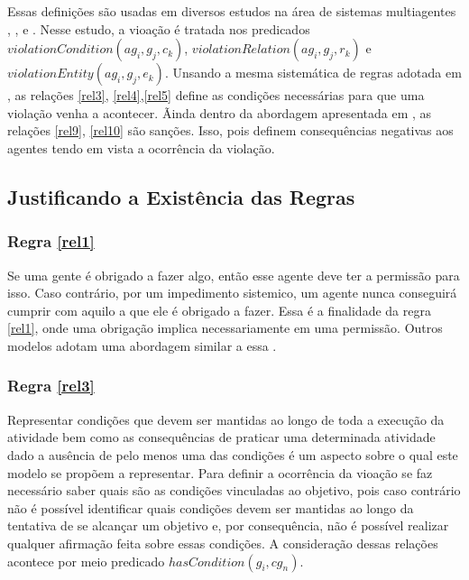 \documentclass[12pt]{article}
\begin{document}
Essas definições são usadas em diversos estudos na área de sistemas multiagentes \cite{dastaniNormativeMultiAgentProgram}, \cite{multiagentsystem}, \cite{amodelmultiagentsystemdynamicrelationship} e \cite{ontologynormative}. Nesse estudo, a vioação é tratada nos predicados $violationCondition(ag_i,g_j,c_k)$, $violationRelation(ag_i,g_j,r_k)$ e $violationEntity(ag_i,g_j,e_k)$. Unsando a mesma sistemática de regras adotada em \cite{dastaniNormativeMultiAgentProgram}, as relações \ref{rel3}, \ref{rel4},\ref{rel5} define as condições necessárias para que uma violação venha a acontecer. Ãinda dentro da abordagem apresentada em \cite{dastaniNormativeMultiAgentProgram}, as relações \ref{rel9}, \ref{rel10} são sanções. Isso, pois definem consequências negativas aos agentes tendo em vista a ocorrência da violação. 


\subsection{Justificando a Existência das Regras}


\subsubsection{Regra \ref{rel1}}

Se uma gente é obrigado a fazer algo, então esse agente deve ter a permissão para isso. Caso contrário, por um impedimento sistemico, um agente nunca conseguirá cumprir com aquilo a que ele é obrigado a fazer. Essa é a finalidade da regra \ref{rel1}, onde uma obrigação implica necessariamente em uma permissão. Outros modelos adotam uma abordagem similar a essa \cite{mosieframework}. 

\subsubsection{Regra \ref{rel3}}

Representar condições que devem ser mantidas ao longo de toda a execução da atividade bem como as consequências de praticar uma determinada atividade dado a ausência de pelo menos uma das condições é um aspecto sobre o qual este modelo se propõem a representar. Para definir a ocorrência da vioação se faz necessário saber quais são as condições vinculadas ao objetivo, pois caso contrário não é possível identificar quais condições devem ser mantidas ao longo da tentativa de se alcançar um objetivo e, por consequência, não é possível realizar qualquer afirmação feita sobre essas condições. A consideração dessas relações acontece por meio predicado $hasCondition(g_i,cg_n)$. 
\end{document}
